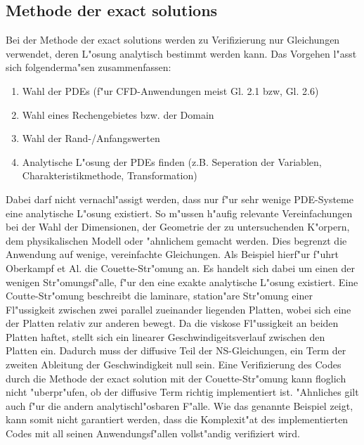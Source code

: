 \subsection{Methode der exact solutions}
Bei der Methode der exact solutions werden zu Verifizierung nur Gleichungen verwendet, deren L"osung analytisch bestimmt werden kann. Das Vorgehen l"asst sich folgenderma"sen zusammenfassen:
\begin{enumerate}
	\item Wahl der PDEs (f"ur CFD-Anwendungen meist Gl. 2.1 bzw, Gl. 2.6)
	\item Wahl eines Rechengebietes bzw. der Domain
	\item Wahl der Rand-/Anfangswerten
	\item Analytische L"osung der PDEs finden (z.B. Seperation der Variablen, Charakteristikmethode, Transformation)
\end{enumerate} 
Dabei darf nicht vernachl"assigt werden, dass nur f"ur sehr wenige PDE-Systeme eine analytische L"osung existiert. So m"ussen h"aufig relevante Vereinfachungen bei der Wahl der Dimensionen, der Geometrie der zu untersuchenden K"orpern, dem physikalischen Modell oder "ahnlichem gemacht werden. Dies begrenzt die Anwendung auf wenige, vereinfachte Gleichungen.
Als Beispiel hierf"ur f"uhrt Oberkampf et Al. \cite{bookMMS} die Couette-Str"omung an. Es handelt sich dabei um einen der wenigen Str"omungsf"alle, f"ur den eine exakte analytische L"osung existiert. Eine Coutte-Str"omung beschreibt die laminare, station"are Str"omung einer Fl"ussigkeit zwischen zwei parallel zueinander liegenden Platten, wobei sich eine der Platten relativ zur anderen bewegt. Da die viskose Fl"ussigkeit an beiden Platten haftet, stellt sich ein linearer Geschwindigeitsverlauf zwischen den Platten ein. Dadurch muss der diffusive Teil der NS-Gleichungen, ein Term der zweiten Ableitung der Geschwindigkeit null sein. Eine Verifizierung des Codes durch die Methode der exact solution mit der Couette-Str"omung kann floglich nicht "uberpr"ufen, ob der diffusive Term richtig implementiert ist. "Ahnliches gilt auch f"ur die andern analytischl"osbaren F"alle.
Wie das genannte Beispiel zeigt, kann somit nicht garantiert werden, dass die Komplexit"at des implementierten Codes mit all seinen Anwendungsf"allen vollst"andig verifiziert wird.

